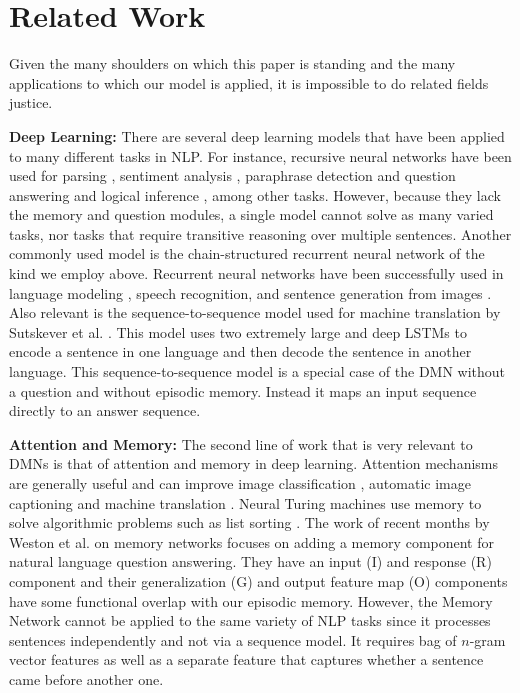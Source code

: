 \documentclass{article}
\begin{document}
\section{Related Work}
Given the many shoulders on which this paper is standing and the many applications to which our model is applied, it is impossible to do related fields justice.
 
\textbf{Deep Learning:}   
There are several deep learning models that have been applied to many different tasks in NLP. For instance, recursive neural networks have been used for parsing \cite{Socher2011}, sentiment analysis \cite{Socher2013EMNLP}, paraphrase detection \cite{Socher2011} and question answering \cite{Iyyer2014} and logical inference \cite{Bowman2014}, among other tasks. However, because they lack the memory and question modules, a single model cannot solve as many varied tasks, nor tasks that require transitive reasoning over multiple sentences.
Another commonly used model is the chain-structured recurrent neural network of the kind we employ above. Recurrent neural networks have been successfully used in language modeling \cite{Mikolov2012}, speech recognition, and sentence generation from images \cite{Karpathy2015}. 
Also relevant is the sequence-to-sequence model used for machine translation by Sutskever et al. \cite{Sutskever2014}. This model uses two extremely large and deep LSTMs to encode a sentence in one language and then decode the sentence in another language. This sequence-to-sequence model is a special case of the DMN without a question and without episodic memory. Instead it maps an input sequence directly to an answer sequence.

\textbf{Attention and Memory:} The second line of work that is very relevant to DMNs is that of attention and memory in deep learning. 
Attention mechanisms are generally useful and can improve image classification \cite{Stollenga2014}, automatic image captioning \cite{Xu2015} and machine translation \cite{Cho2014b,Bahdanau2015}. Neural Turing machines use memory to solve algorithmic problems such as list sorting \cite{Graves2014}. The work of recent months by Weston et al. on memory networks \cite{Weston2015} focuses on adding a memory component for natural language question answering. They have an input (I) and response (R) component and their generalization (G) and output feature map (O) components have some functional overlap with our episodic memory. 
However, the Memory Network cannot be applied to the same variety of NLP tasks since it processes sentences independently and not via a sequence model. It requires bag of $n$-gram vector features as well as a separate feature that captures whether a sentence came before another one. 
\end{document}
